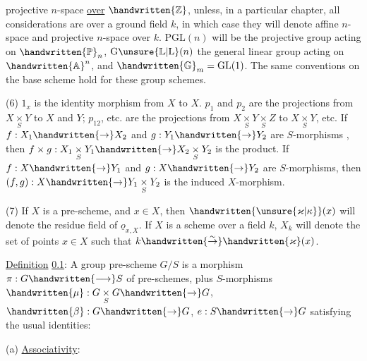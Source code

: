 
projective $n$-space \uline{over} \uline{$\handwritten{\mathbb Z}$}, unless, in a particular chapter, all considerations are over a ground field $k$, in which case they will denote affine $n$-space and projective $n$-space over $k$. $\mathrm{PGL}(n)$ will be the projective group acting on $\handwritten{\mathbb P}_n$, $\mathrm{G}\unsure{\mathbb L|\mathrm L}(n)$ the general linear group acting on $\handwritten{\mathbb A}^{n}$, and $\handwritten{\mathbb G}_m=\mathrm{GL}(1)$. The same conventions on the base scheme hold for these group schemes.

(6) $1_x$ is the identity morphism from $X$ to $X$. $p_1$ and $p_2$ are the projections from $X\underset{S}{\times}Y$ to $X$ and $Y$; $p_{12}$, etc. are the projections from $X\underset{S}{\times}Y\underset{S}{\times}Z$ to $X\underset{S}{\times}Y$, etc. If $f:X_1\handwritten{\to}X_2$ and $g:Y_1\handwritten{\to}Y_2$ are $S$-morphisms , then $f\times g:X_1\underset{S}{\times}Y_1\handwritten{\to}X_2\underset{S}{\times}Y_2$ is the product. If $f:X\handwritten{\to}Y_1$ and $g:X\handwritten{\to}Y_2$ are $S$-morphisms, then $(f,g):X\handwritten{\to}Y_1\underset{S}{\times}Y_2$ is the induced $X$-morphism.

(7) If $X$ is a pre-scheme, and $x\in X$, then $\handwritten{\unsure{\varkappa|\kappa}}(x)$ will denote the residue field of $\underline{o}_{x,X}$. If $X$ is a scheme over a field $k$, $X_k$ will denote the set of points $x\in X$ such that $k\handwritten{\overset{\sim}{\to}}\handwritten{\varkappa}(x)$.

 \uline{Definition} \uline{0.1}: A group pre-scheme $G/S$ is a morphism $\pi:G\handwritten{\longrightarrow}S$ of pre-schemes, plus $S$-morphisms $\handwritten{\mu}:G\underset{S}{\times}G\handwritten{\to}G$, $\handwritten{\beta}:G\handwritten{\to}G$, $e:S\handwritten{\to}G$ satisfying the usual identities:

(a) \uline{Associativity}:
